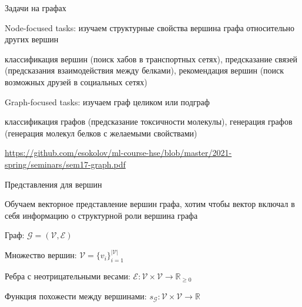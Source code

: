 \documentclass[notes,12pt, aspectratio=169]{beamer}
\newenvironment{wideitemize}{\itemize\addtolength{\itemsep}{10pt}}{\enditemize}
\begin{document}
\begin{frame}{Задачи на графах}
	\begin{wideitemize}
		\item  \alert{Node-focused tasks:}  изучаем структурные свойства вершина графа относительно других вершин 
		
		\item классификация вершин (поиск хабов в транспортных сетях), предсказание связей (предсказания взаимодействия между белками), рекомендация вершин (поиск возможных друзей в социальных сетях)
		
		\item  \alert{Graph-focused tasks:}  изучаем граф целиком или подграф
		
		\item  классификация графов (предсказание токсичности молекулы), генерация графов (генерация молекул белков с желаемыми свойствами)
		
	\end{wideitemize}
	\vfill
	\footnotesize
	{\color{blue} \url{https://github.com/esokolov/ml-course-hse/blob/master/2021-spring/seminars/sem17-graph.pdf}  } 
\end{frame}


\begin{frame}{Представления для вершин}
	\begin{wideitemize}
		\item  Обучаем векторное представление вершин графа, хотим чтобы вектор включал в себя информацию о структурной роли вершина графа
		
		\item  Граф:  $\mathcal{G} = (\mathcal{V}, \mathcal{E})$ 

		\item  Множество вершин:  $\mathcal{V} = \{v_i\}_{i=1}^{|\mathcal{V}|}$ 
		
		\item  Ребра с неотрицательными весами: $\mathcal{E}: \mathcal{V}\times\mathcal{V}\to\mathbb{R}_{\ge 0}$
		
		\item  Функция похожести между вершинами:  $s_{\mathcal{G}}: \mathcal{V}\times\mathcal{V}\to\mathbb{R}$

	\end{wideitemize}
\end{frame}
\end{document}
